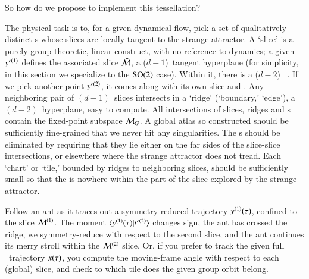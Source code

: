 \documentclass[preprint,12pt]{elsarticle} %
\begin{document}
So how do we propose to implement this tessellation?

The physical task is to, for a given dynamical flow, pick a set of
qualitatively distinct {\template s} whose slices are locally tangent to
the strange attractor. A `slice' is a purely group-theoretic, linear
construct, with no reference to dynamics; a given {\template}
${y'}{}^{(1)}$ defines the associated slice $\bar{\cal M}$, a
($d\!-\!1$)\dmn\ tangent hyperplane (for simplicity, in this section we
specialize to the $\textrm{SO}(2)$ case). Within it, there is a ($d\!-\!2$)\dmn\
{\sset} . If we pick another {\template} point
${y'}{}^{(2)}$, it comes along with its own slice and {\sset}. Any
neighboring pair of $(d\!-\!1)$\dmn\ slices intersects in a `ridge'
(`boundary,' `edge'), a $(d\!-\!2)$\dmn\ hyperplane, easy to compute. All
intersections of slices, ridges and {\sset s} contain the fixed-point
subspace ${\cal M}_{G}$. A global atlas so constructed should be sufficiently
fine-grained that we never hit any {\sset} singularities. The {\sset}s
should be eliminated by requiring that they lie either on the far sides
of the slice-slice intersections, or elsewhere where the strange
attractor does not tread. Each `chart' or `tile,' bounded by ridges to
neighboring slices, should be sufficiently small so that the {\sset} is
nowhere within the part of the slice explored by the strange attractor.

Follow an ant as it traces out a symmetry-reduced trajectory
$y{}^{(1)}(\tau)$, confined to the slice $\bar{\cal M}{}^{(1)}$. The
moment $\braket{\sspRed{}^{(1)}(\tau)}{\sliceTan{}{}^{(2)}}$ changes
sign, the ant has crossed the ridge, we symmetry-reduce with respect to
the second slice, and the ant continues its merry stroll within the
$\bar{\cal M}{}^{(2)}$ slice. Or, if you prefer to track the  given full
\statesp\ trajectory $x(\tau)$, you compute the moving-frame angle
with respect to each (global) slice, and check to which tile does the
given group orbit belong.
\end{document}
